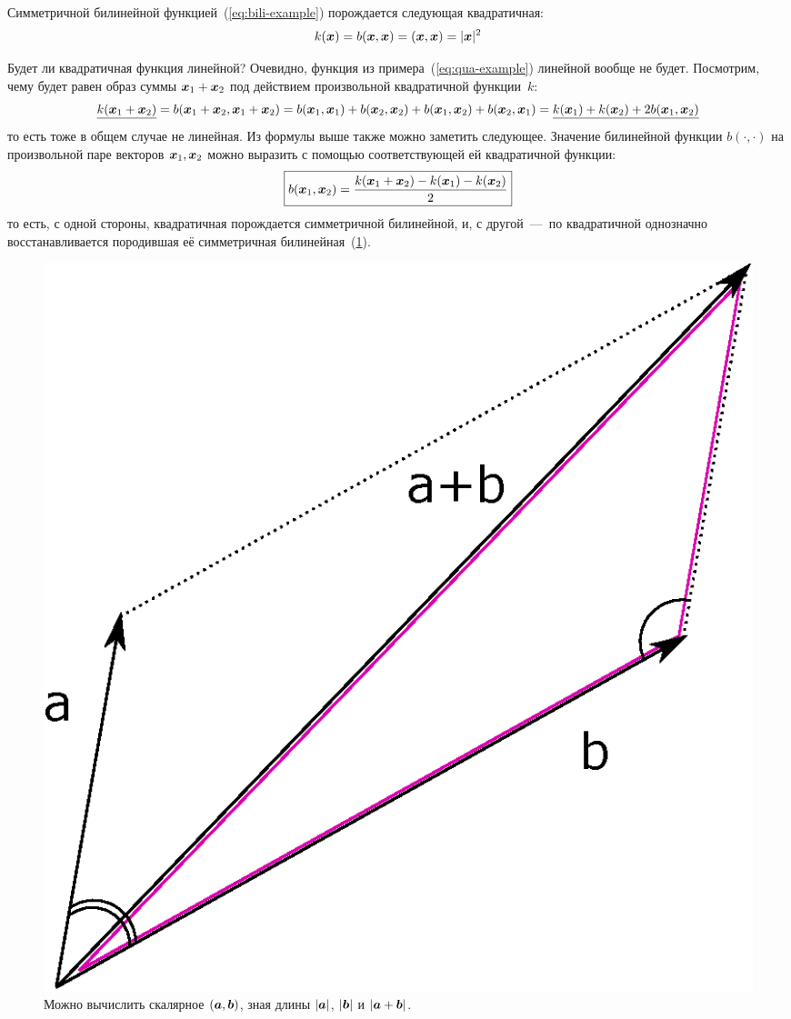 \documentclass[a4paper,12pt]{article}
\begin{document}
  \begin{example}
    Симметричной билинейной функцией~(\ref{eq:bili-example}) порождается следующая квадратичная:
    \begin{equation}\label{eq:qua-example}
      k(\boldsymbol x) = b(\boldsymbol x, \boldsymbol x) = (\boldsymbol x, \boldsymbol x) = |\boldsymbol x|^2
    \end{equation}
  \end{example}
  
  Будет ли квадратичная функция линейной?
  Очевидно, функция из примера~(\ref{eq:qua-example}) линейной вообще не будет.
  Посмотрим, чему будет равен образ суммы $\bds x_1 \hm+ \bds x_2$ под действием произвольной квадратичной функции~$k$:
  \[
    \underline{k(\boldsymbol x_1 + \boldsymbol x_2)}
    = b(\boldsymbol x_1 + \boldsymbol x_2, \boldsymbol x_1 + \boldsymbol x_2)
    = b(\boldsymbol x_1, \boldsymbol x_1) + b(\boldsymbol x_2, \boldsymbol x_2) + b(\boldsymbol x_1, \boldsymbol x_2) + b(\boldsymbol x_2, \boldsymbol x_1)
    = \underline{k(\boldsymbol x_1) + k(\boldsymbol x_2) + 2 b(\boldsymbol x_1, \boldsymbol x_2)}
  \]
  то есть тоже в общем случае не линейная.
  Из формулы выше также можно заметить следующее.
  Значение билинейной функции $b(\cdot, \cdot)$ на произвольной паре векторов $\boldsymbol x_1, \boldsymbol x_2$ можно выразить с помощью соответствующей ей квадратичной функции:
  \[
    \boxed{
      b(\boldsymbol x_1, \boldsymbol x_2) = \frac{k(\boldsymbol x_1 + \boldsymbol x_2) - k(\boldsymbol x_1) - k(\boldsymbol x_2)}{2}
    }
  \]
  то есть, с одной стороны, квадратичная порождается симметричной билинейной, и, с другой~---~по квадратичной однозначно восстанавливается породившая её симметричная билинейная~(\ref{fig:vector-scalar}).
  
  \begin{figure}[h!]
    \centering
  
    \includegraphics[width=0.5\columnwidth]{vector-scalar}
  
    \caption{Можно вычислить скалярное $(\boldsymbol a, \boldsymbol b)$, зная длины $|\boldsymbol a|$, $|\boldsymbol b|$ и $|\bds a \hm+ \bds b|$.}
    \label{fig:vector-scalar}
  \end{figure}
  
\end{document}
